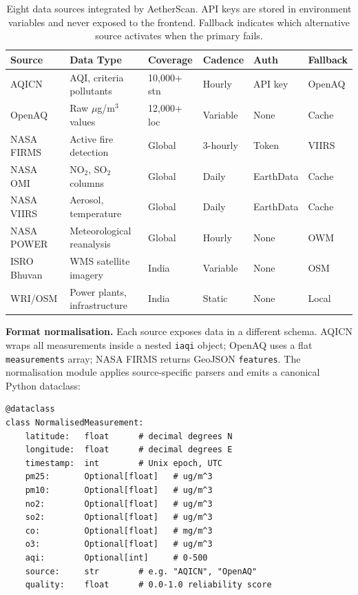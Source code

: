 \documentclass[12pt,a4paper]{article}
\begin{document}
\begin{table}[H]
\centering
\caption[Integrated data sources and operational characteristics]{%
Eight data sources integrated by AetherScan. API keys are stored in
environment variables and never exposed to the frontend. Fallback indicates
which alternative source activates when the primary fails.}
\label{tab:datasources}
\setlength{\tabcolsep}{4pt}
\begin{tabularx}{\textwidth}{@{}lXllll@{}}
\toprule
\textbf{Source} & \textbf{Data Type} & \textbf{Coverage} &
\textbf{Cadence} & \textbf{Auth} & \textbf{Fallback} \\
\midrule
AQICN       & AQI, criteria pollutants  & 10,000+ stn & Hourly   & API key & OpenAQ \\
OpenAQ      & Raw $\mu$g/m$^3$ values   & 12,000+ loc & Variable & None    & Cache  \\
NASA FIRMS  & Active fire detection     & Global      & 3-hourly & Token   & VIIRS  \\
NASA OMI    & NO$_2$, SO$_2$ columns    & Global      & Daily    & EarthData & Cache \\
NASA VIIRS  & Aerosol, temperature      & Global      & Daily    & EarthData & Cache \\
NASA POWER  & Meteorological reanalysis & Global      & Hourly   & None    & OWM   \\
ISRO Bhuvan & WMS satellite imagery     & India       & Variable & None    & OSM   \\
WRI/OSM     & Power plants, infrastructure & India    & Static   & None    & Local \\
\bottomrule
\end{tabularx}
\end{table}

\noindent\textbf{Format normalisation.}
Each source exposes data in a different schema. AQICN wraps all measurements
inside a nested \texttt{iaqi} object; OpenAQ uses a flat \texttt{measurements}
array; NASA FIRMS returns GeoJSON \texttt{features}. The normalisation module
applies source-specific parsers and emits a canonical Python dataclass:

\begin{lstlisting}[caption={Canonical normalised measurement schema (Python dataclass)}]
@dataclass
class NormalisedMeasurement:
    latitude:   float      # decimal degrees N
    longitude:  float      # decimal degrees E
    timestamp:  int        # Unix epoch, UTC
    pm25:       Optional[float]   # ug/m^3
    pm10:       Optional[float]   # ug/m^3
    no2:        Optional[float]   # ug/m^3
    so2:        Optional[float]   # ug/m^3
    co:         Optional[float]   # mg/m^3
    o3:         Optional[float]   # ug/m^3
    aqi:        Optional[int]     # 0-500
    source:     str        # e.g. "AQICN", "OpenAQ"
    quality:    float      # 0.0-1.0 reliability score
\end{lstlisting}
\end{document}
